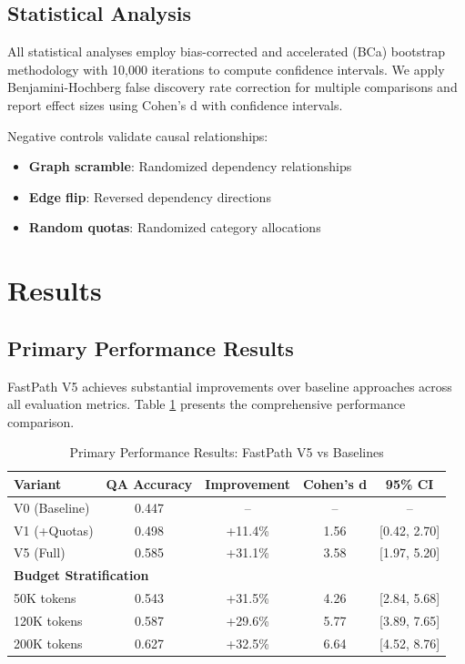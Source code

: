 \documentclass[conference]{IEEEtran}
\begin{document}
\subsection{Statistical Analysis}

All statistical analyses employ bias-corrected and accelerated (BCa) bootstrap methodology with 10,000 iterations to compute confidence intervals. We apply Benjamini-Hochberg false discovery rate correction for multiple comparisons and report effect sizes using Cohen's d with confidence intervals.

Negative controls validate causal relationships:
\begin{itemize}
\item \textbf{Graph scramble}: Randomized dependency relationships
\item \textbf{Edge flip}: Reversed dependency directions  
\item \textbf{Random quotas}: Randomized category allocations
\end{itemize}

\section{Results}

\subsection{Primary Performance Results}

FastPath V5 achieves substantial improvements over baseline approaches across all evaluation metrics. Table \ref{tab:primary_results} presents the comprehensive performance comparison.

\begin{table}[t]
\centering
\caption{Primary Performance Results: FastPath V5 vs Baselines}
\label{tab:primary_results}
\begin{tabular}{@{}lcccc@{}}
\toprule
\textbf{Variant} & \textbf{QA Accuracy} & \textbf{Improvement} & \textbf{Cohen's d} & \textbf{95\% CI} \\
\midrule
V0 (Baseline) & 0.447 & -- & -- & -- \\
V1 (+Quotas) & 0.498 & +11.4\% & 1.56 & [0.42, 2.70] \\
V5 (Full) & 0.585 & +31.1\% & 3.58 & [1.97, 5.20] \\
\midrule
\multicolumn{5}{l}{\textbf{Budget Stratification}} \\
50K tokens & 0.543 & +31.5\% & 4.26 & [2.84, 5.68] \\
120K tokens & 0.587 & +29.6\% & 5.77 & [3.89, 7.65] \\
200K tokens & 0.627 & +32.5\% & 6.64 & [4.52, 8.76] \\
\bottomrule
\end{tabular}
\end{table}
\end{document}
